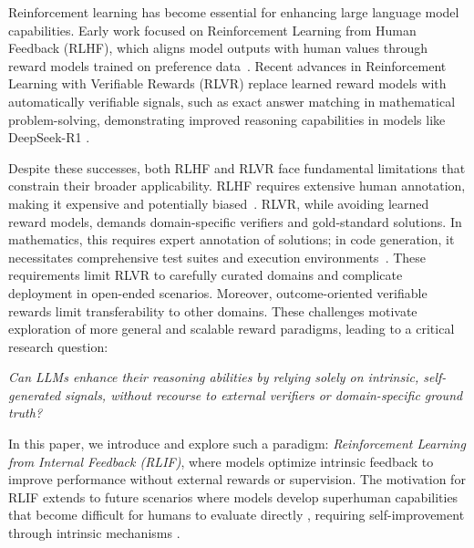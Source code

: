 \documentclass{article} %
\begin{document}
Reinforcement learning has become essential for enhancing large language model capabilities. Early work focused on Reinforcement Learning from Human Feedback (RLHF), which aligns model outputs with human values through reward models trained on preference data~\citep{ouyang2022training}. Recent advances in Reinforcement Learning with Verifiable Rewards (RLVR) replace learned reward models with automatically verifiable signals, such as exact answer matching in mathematical problem-solving, demonstrating improved reasoning capabilities in models like DeepSeek-R1 \citep{guo2025deepseek,lambert2024t}.

Despite these successes, both RLHF and RLVR face fundamental limitations that constrain their broader applicability. RLHF requires extensive human annotation, making it expensive and potentially biased~\citep{gao2023scaling}. RLVR, while avoiding learned reward models, demands domain-specific verifiers and gold-standard solutions. In mathematics, this requires expert annotation of solutions; in code generation, it necessitates comprehensive test suites and execution environments~\citep{liu2023your,code-r1,team2025kimi,xiaomi2025mimo}. These requirements limit RLVR to carefully curated domains and complicate deployment in open-ended scenarios. Moreover, outcome-oriented verifiable rewards limit transferability to other domains. These challenges motivate exploration of more general and scalable reward paradigms, leading to a critical research question:
\begin{center}
\emph{Can LLMs enhance their reasoning abilities by relying solely on intrinsic, self-generated signals, without recourse to external verifiers or domain-specific ground truth?}
\end{center}

In this paper, we introduce and explore such a paradigm: \emph{Reinforcement Learning from Internal Feedback (RLIF)}, where models optimize intrinsic feedback to improve performance without external rewards or supervision. The motivation for RLIF extends to future scenarios where models develop superhuman capabilities that become difficult for humans to evaluate directly \citep{burns2023weak}, requiring self-improvement through intrinsic mechanisms \citep{oudeyer2007intrinsic}.
\end{document}
